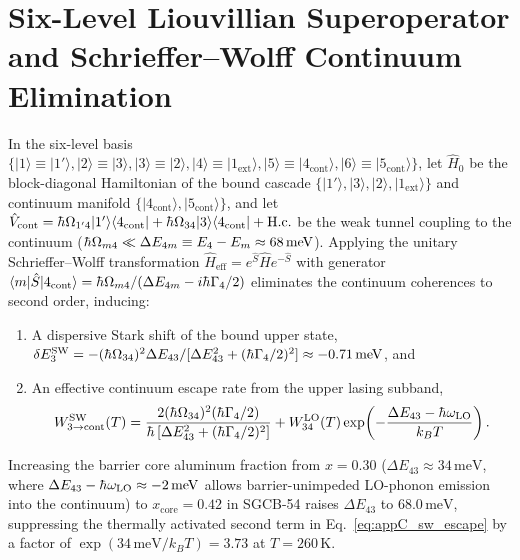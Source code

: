 \documentclass[11pt,letterpaper]{article}
\renewcommand{\hbar}{\mathchar'26\mkern-9mu h}
\begin{document}
\section{Six-Level Liouvillian Superoperator and Schrieffer--Wolff Continuum Elimination}
\label{app:dm_superoperator}

In the six-level basis $\{|1\rangle \equiv |1'\rangle, |2\rangle \equiv |3\rangle, |3\rangle \equiv |2\rangle, |4\rangle \equiv |1_{\mathrm{ext}}\rangle, |5\rangle \equiv |4_{\mathrm{cont}}\rangle, |6\rangle \equiv |5_{\mathrm{cont}}\rangle\}$, let $\hat{H}_0$ be the block-diagonal Hamiltonian of the bound cascade $\{|1'\rangle, |3\rangle, |2\rangle, |1_{\mathrm{ext}}\rangle\}$ and continuum manifold $\{|4_{\mathrm{cont}}\rangle, |5_{\mathrm{cont}}\rangle\}$, and let $\hat{V}_{\mathrm{cont}} = \hbar\Omega_{1'4}|1'\rangle\langle 4_{\mathrm{cont}}| + \hbar\Omega_{34}|3\rangle\langle 4_{\mathrm{cont}}| + \mathrm{H.c.}$ be the weak tunnel coupling to the continuum ($\hbar\Omega_{m4} \ll \Delta E_{4m} \equiv E_4 - E_m \approx 68\,\mathrm{meV}$). Applying the unitary Schrieffer--Wolff transformation $\hat{H}_{\mathrm{eff}} = e^{\hat{S}}\hat{H}e^{-\hat{S}}$ with generator $\langle m|\hat{S}|4_{\mathrm{cont}}\rangle = \hbar\Omega_{m4}/(\Delta E_{4m} - i\hbar\Gamma_4/2)$ eliminates the continuum coherences to second order, inducing:
\begin{enumerate}
    \item A dispersive Stark shift of the bound upper state, $\delta E_3^{\mathrm{SW}} = -(\hbar\Omega_{34})^2 \Delta E_{43} / [\Delta E_{43}^2 + (\hbar\Gamma_4/2)^2] \approx -0.71\,\mathrm{meV}$, and
    \item An effective continuum escape rate from the upper lasing subband,
    \begin{equation}
    W_{3 \to \mathrm{cont}}^{\mathrm{SW}}(T) = \frac{2(\hbar\Omega_{34})^2 (\hbar\Gamma_4/2)}{\hbar\left[\Delta E_{43}^2 + (\hbar\Gamma_4/2)^2\right]} + W_{34}^{\mathrm{LO}}(T)\exp\!\left(-\frac{\Delta E_{43} - \hbar\omega_{\mathrm{LO}}}{k_B T}\right).
    \label{eq:appC_sw_escape}
    \end{equation}
\end{enumerate}
Increasing the barrier core aluminum fraction from $x = 0.30$ ($\Delta E_{43} \approx 34\,\mathrm{meV}$, where $\Delta E_{43} - \hbar\omega_{\mathrm{LO}} \approx -2\,\mathrm{meV}$ allows barrier-unimpeded LO-phonon emission into the continuum) to $x_{\mathrm{core}} = 0.42$ in SGCB-54 raises $\Delta E_{43}$ to $68.0\,\mathrm{meV}$, suppressing the thermally activated second term in Eq.~\eqref{eq:appC_sw_escape} by a factor of $\exp(34\,\mathrm{meV}/k_B T) = 3.73$ at $T = 260\,\mathrm{K}$.
\end{document}

